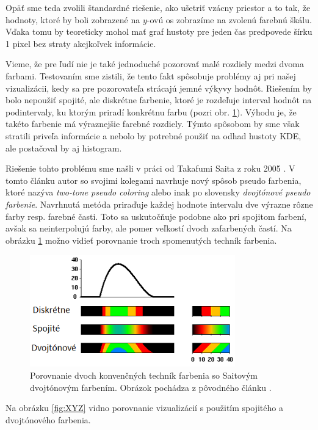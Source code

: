 Opäť sme teda zvolili štandardné riešenie, ako ušetriť vzácny priestor a to tak, že hodnoty, ktoré by boli zobrazené na $ y $-ovú os zobrazíme na zvolenú farebnú škálu. Vďaka tomu by teoreticky mohol mať graf hustoty pre jeden čas predpovede šírku 1 pixel bez straty akejkoľvek informácie.

Vieme, že pre ľudí nie je také jednoduché pozorovať malé rozdiely medzi dvoma farbami. Testovaním sme zistili, že tento fakt spôsobuje problémy aj pri našej vizualizácii, kedy sa pre pozorovateľa strácajú jemné výkyvy hodnôt. Riešením by bolo nepoužiť spojité, ale diskrétne farbenie, ktoré je rozdeľuje interval hodnôt na podintervaly, ku ktorým priradí konkrétnu farbu (pozri obr. \ref{fig:twotone}). Výhodu je, že takéto farbenie má výraznejšie farebné rozdiely. Týmto spôsobom by sme však stratili priveľa informácie a nebolo by potrebné použiť na odhad hustoty KDE, ale postačoval by aj histogram. 

Riešenie tohto problému sme našli v práci od Takafumi Saita z roku 2005 \cite{Saito}. V tomto článku autor so svojimi kolegami navrhuje nový spôsob pseudo farbenia, ktoré nazýva \textit{two-tone pseudo coloring} alebo inak po slovensky \textit{dvojtónové pseudo farbenie}. Navrhnutá metóda priraďuje každej hodnote intervalu dve výrazne rôzne farby resp. farebné časti. Toto sa uskutočňuje podobne ako pri spojitom farbení, avšak sa neinterpolujú farby, ale pomer veľkostí dvoch zafarbených častí. Na obrázku \ref{fig:twotone} možno vidieť porovnanie troch spomenutých techník farbenia.

\begin{figure}
	\centering
	\includegraphics[width = 3.5in]{twotone}
	\caption{Porovnanie dvoch konvenčných techník farbenia so Saitovým dvojtónovým farbením. Obrázok pochádza z pôvodného článku \cite{Saito}. }
	\label{fig:twotone} 
\end{figure}


Na obrázku \ref{fig:XYZ} vidno porovnanie vizualizácií s použitím spojitého a dvojtónového farbenia.

